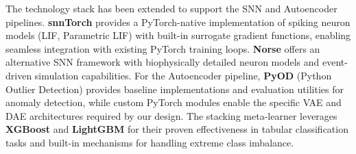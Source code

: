 The technology stack has been extended to support the SNN and Autoencoder pipelines. \textbf{snnTorch} provides a PyTorch-native implementation of spiking neuron models (LIF, Parametric LIF) with built-in surrogate gradient functions, enabling seamless integration with existing PyTorch training loops. \textbf{Norse} offers an alternative SNN framework with biophysically detailed neuron models and event-driven simulation capabilities. For the Autoencoder pipeline, \textbf{PyOD} (Python Outlier Detection) provides baseline implementations and evaluation utilities for anomaly detection, while custom PyTorch modules enable the specific VAE and DAE architectures required by our design. The stacking meta-learner leverages \textbf{XGBoost} and \textbf{LightGBM} for their proven effectiveness in tabular classification tasks and built-in mechanisms for handling extreme class imbalance.
